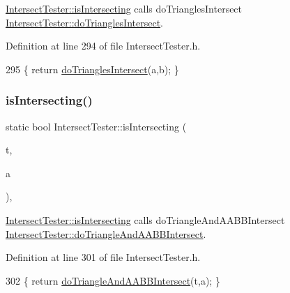 \hyperlink{class_intersect_tester_a7710e17ff7d2e229059f23b9429213f5}{Intersect\+Tester\+::is\+Intersecting} calls do\+Triangles\+Intersect  \hyperlink{class_intersect_tester_a42709665c17cf203a7157466fdccd10f}{Intersect\+Tester\+::do\+Triangles\+Intersect}. 



Definition at line 294 of file Intersect\+Tester.\+h.


\begin{DoxyCode}
295     \{ \textcolor{keywordflow}{return} \hyperlink{class_intersect_tester_a42709665c17cf203a7157466fdccd10f}{doTrianglesIntersect}(a,b); \}
\end{DoxyCode}
\mbox{\label{class_intersect_tester_a7676eefb6df137a07551f4b49f8926a6}} 
\subsubsection{\texorpdfstring{is\+Intersecting()}{isIntersecting()}\hspace{0.1cm}{\footnotesize\ttfamily [14/15]}}
{\footnotesize\ttfamily static bool Intersect\+Tester\+::is\+Intersecting (\begin{DoxyParamCaption}\item[{\hyperlink{class_triangle}{Triangle}}]{t,  }\item[{\hyperlink{class_a_a_b_b}{A\+A\+BB}}]{a }\end{DoxyParamCaption})\hspace{0.3cm}{\ttfamily [inline]}, {\ttfamily [static]}}



\hyperlink{class_intersect_tester_a7710e17ff7d2e229059f23b9429213f5}{Intersect\+Tester\+::is\+Intersecting} calls do\+Triangle\+And\+A\+A\+B\+B\+Intersect  \hyperlink{class_intersect_tester_acb2dbd261f6351d83cf7471a972b5b52}{Intersect\+Tester\+::do\+Triangle\+And\+A\+A\+B\+B\+Intersect}. 



Definition at line 301 of file Intersect\+Tester.\+h.


\begin{DoxyCode}
302     \{ \textcolor{keywordflow}{return} \hyperlink{class_intersect_tester_acb2dbd261f6351d83cf7471a972b5b52}{doTriangleAndAABBIntersect}(t,a); \}
\end{DoxyCode}
\mbox{\label{class_intersect_tester_a3996af79d5b862299a88dbb5705da88f}} 
